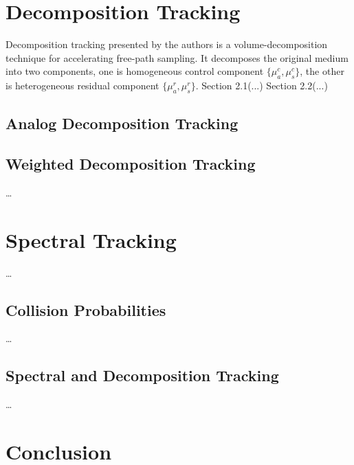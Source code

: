 \chapter{Decomposition Tracking}
\label{ch:Content1}
Decomposition tracking presented by the authors is a volume-decomposition technique for accelerating free-path sampling. It decomposes the original medium into two components, one is homogeneous control component $\{ \mu_a^c, \mu_s^c\}$, the other is heterogeneous residual component $\{ \mu_a^r, \mu_s^r\}$.
Section 2.1(...) Section 2.2(...)

\section{Analog Decomposition Tracking}
\label{ch:Content1:sec:Section1}



\section{Weighted Decomposition Tracking}
\label{ch:Content1:sec:Section2}

\dots



\chapter{Spectral Tracking}
\label{ch:Content2}

\dots


\section{Collision Probabilities}
\label{ch:Content2:sec:Section1}

\dots


\section{Spectral and Decomposition Tracking}
\label{ch:Content2:sec:Section2}

\dots

\chapter{Conclusion}
\label{ch:Content1}
